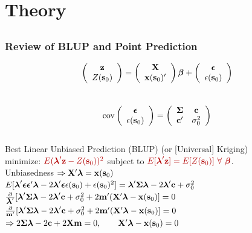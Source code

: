 \documentclass[mathserif,compress]{beamer}\usepackage{graphicx, color}
\def\bc{\mathbf{c}}
\def\bm{\mathbf{m}}
\def\bs{\mathbf{s}}
\def\bx{\mathbf{x}}
\def\bz{\mathbf{z}}
\def\bX{\mathbf{X}}
\def\bbeta{\mbox{\boldmath $\beta$}}
\def\bepsilon{\mbox{\boldmath $\epsilon$}}
\def\blambda{\mbox{\boldmath $\lambda$}}
\def\bSigma{\mbox{\boldmath $\Sigma$}}
\def\cov{\textrm{cov}}
\def\upp{^\prime}
\newcommand{\cre}[1]{\color{red!70!black}#1}
\begin{document}

\section{Theory}
\subsection{}
\begin{frame}[fragile]
\frametitle{Review of BLUP and Point Prediction}
	\vspace{-.5cm}
	\[
		\left(\begin{array}{c}
		\bz \\ Z(\bs_0)
		\end{array}\right)	=
		\left(\begin{array}{c}
		\bX \\ \bx(\bs_0)\upp
		\end{array}\right)\bbeta +
		\left(\begin{array}{c}
		\bepsilon \\ \epsilon(\bs_0)
		\end{array}\right)
	\] \\
	\[ 
		\cov\left(\begin{array}{c}
		\bepsilon \\ \epsilon(\bs_0)
		\end{array}\right) = 
		\left(\begin{array}{cc}
		\bSigma & \bc \\ \bc\upp & \sigma_0^2
		\end{array}\right)
	\]
	 \\
	Best Linear Unbiased Prediction (BLUP) (or [Universal] Kriging) \\
	minimize: $\cre{E(\blambda\upp\bz - Z(\bs_0))^2}$ subject to 	$\cre{E[\blambda\upp\bz] = E[Z(\bs_0)] \ \forall \ \bbeta}$. \\
	Unbiasedness $\Rightarrow \bX\upp\blambda = \bx(\bs_0) $ \\		
	$E[\blambda\upp\bepsilon\bepsilon\upp\blambda - 2\blambda\upp\bepsilon \epsilon(\bs_0) + \epsilon(\bs_0)^2] = \blambda\upp\bSigma\blambda - 2\blambda\upp\bc + \sigma_0^2$ \\
	$\frac{\partial}{\blambda\upp} [\blambda\upp\bSigma\blambda - 2\blambda\upp\bc + \sigma_0^2 + 2\bm\upp(\bX\upp\blambda - \bx(\bs_0)] = 0$ \\
	$\frac{\partial}{\bm\upp} [\blambda\upp\bSigma\blambda - 2\blambda\upp\bc + \sigma_0^2 + 2\bm\upp(\bX\upp\blambda - \bx(\bs_0)] = 0$ \\
	$\Rightarrow 2\bSigma\blambda - 2\bc  + 2\bX\bm = 0, \quad \quad \bX\upp\blambda - \bx(\bs_0) = 0$ \\
	 

\end{frame}
\end{document}
